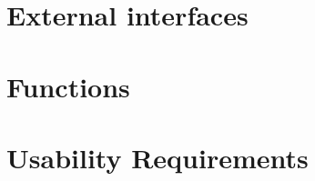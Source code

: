 \documentclass{scrreprt}
\begin{document}
\section{External interfaces}


\section{Functions}


\section{Usability Requirements}
\end{document}
